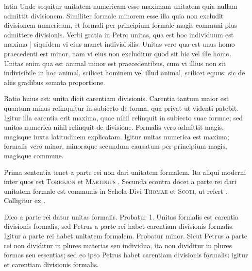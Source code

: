 \begin{otherlanguage*}{latin}
\pstart
 Unde sequitur unitatem numericam esse maximam unitatem quia nullam admittit divisionem. Similiter formale minorem esse illa quia non excludit divisionem numericam, et  formali per principium formale magis communi plus admittere divisionis. Verbi gratia in Petro unitas, qua est hoc individuum est maxima \textnormal{|} siquidem vi eius manet indivisibilis. Unitas vero qua est unus homo praecedenti est minor, nam vi eius non excluditur quod sit hic vel ille homo. Unitas enim qua est animal minor est praecedentibus, cum vi illius non sit indivisibile in hoc animal, scilicet hominem vel illud animal, scilicet equus: sic de aliis gradibus semata proportione. 
\pend

\pstart
 Ratio huius est: unita dicit carentiam divisionis. Carentia tantum maior est quantum minus relinquitur in subiecto de forma, qua privat ut videnti patebit. Igitur illa carentia erit maxima, quae nihil relinquit in subiecto suae formae; sed unitas numerica nihil relinquit de divisione. Formalis vero admittit magis, magisque iuxta latitudinem explicatam. Igitur unitas numerica est maxima; formalis vero minor, minoraque secundum causatum per principium magis, magisque commune. 
\pend

\pstart
 Prima sententia tenet a parte rei non dari unitatem formalem. Ita aliqui moderni inter quos est \textsc{Torrejon} et \textsc{Martinius} . Secunda econtra docet a parte rei dari unitatem formale est communis in Schola Divi \textsc{Thomae} et \textsc{Scoti}, ut refert . Colligitur ex . 
\pend

\pstart
 Dico a parte rei datur unitas formalis. Probatur 1. Unitas formalis est carentia divisionis formalis, sed Petrus a parte rei habet carentiam divisionis formalis. Igitur a parte rei habet unitatem formalem. Probatur minor. Sicut Petrus a parte rei non dividitur in plures materias seu individua, ita non dividitur in plures formas seu essentias; sed eo ipso Petrus habet carentiam divisionis formalis: igitur et carentiam divisionis formalis. 
\pend


\end{otherlanguage*}
